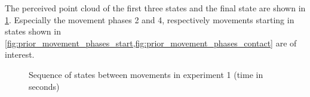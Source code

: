 The perceived point cloud of the first three states and the final state are shown in \cref{fig:prior_movement_phases}.
Especially the movement phases 2 and 4, respectively movements starting in states shown in \cref{fig:prior_movement_phases_start,fig:prior_movement_phases_contact} are of interest.

\begin{figure}[h]
\centering
{}
\caption[Experiment 1: States between movements]{Sequence of states between movements in experiment 1 (time in seconds)}
\label{fig:prior_movement_phases}
\end{figure}

